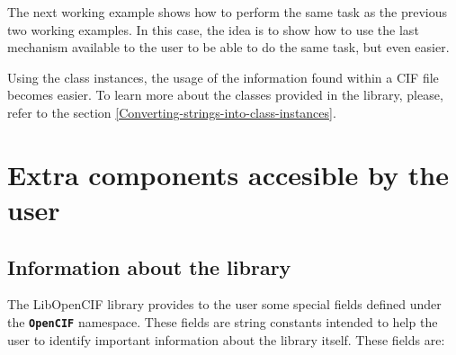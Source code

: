 \documentclass[11pt,twoside,openany,x11names,svgnames]{memoir}
\begin{document}
The next working example shows how to perform the same task as the previous two working examples. In this case, the idea is to show how to use the last mechanism available to the user to be able to do the same task, but even easier.



Using the class instances, the usage of the information found within a CIF file becomes easier. To learn more about the classes provided in the library, please, refer to the section \ref{Converting-strings-into-class-instances}.

\section{Extra components accesible by the user}\label{Extra-components-accesible-by-the-user}

\subsection{Information about the library}

The LibOpenCIF library provides to the user some special fields defined under the \textbf{\texttt{OpenCIF}} namespace. These fields are string constants intended to help the user to identify important information about the library itself. These fields are:
\end{document}
